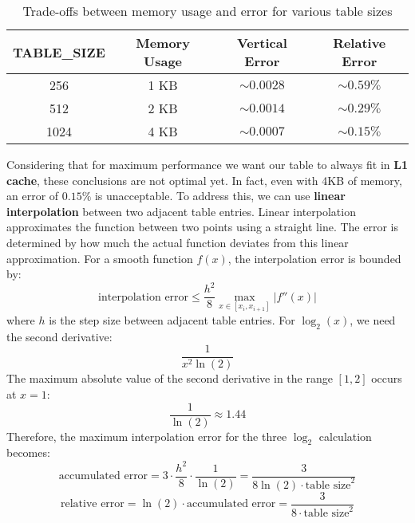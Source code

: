 \documentclass[11pt]{article}
\begin{document}
\begin{table}[h]
\centering
\begin{tabular}{|c|c|c|c|}
\hline
\textbf{TABLE\_SIZE} & \textbf{Memory Usage} & \textbf{Vertical Error} & \textbf{Relative Error} \\
\hline
256  & 1 KB & $\sim 0.0028$ & $\sim 0.59\%$ \\
512  & 2 KB & $\sim 0.0014$ & $\sim 0.29\%$ \\
1024 & 4 KB & $\sim 0.0007$ & $\sim 0.15\%$ \\
\hline
\end{tabular}
\caption{Trade-offs between memory usage and error for various table sizes}
\end{table}
Considering that for maximum performance we want our table to always fit in \textbf{L1 cache}, these conclusions are not optimal yet. In fact, even with 4KB of memory, an error of $0.15\%$ is unacceptable. To address this, we can use \textbf{linear interpolation}\textsuperscript{\cite{linear_interp}} between two adjacent table entries. Linear interpolation approximates the function between two points using a straight line. The error is determined by how much the actual function deviates from this linear approximation. For a smooth function $f(x)$, the interpolation error is bounded by:
\setcounter{equation}{0}
\begin{equation}
    \text{interpolation error} \leq \frac{h^2}{8} \max_{x \in [x_i, x_{i+1}]} |f''(x)|
\end{equation}
where $h$ is the step size between adjacent table entries. For $\log_2(x)$, we need the second derivative:
\begin{equation}
    \frac{1}{x^2 \ln(2)}
\end{equation}
The maximum absolute value of the second derivative in the range $[1, 2]$ occurs at $x = 1$:
\begin{equation}
    \frac{1}{\ln(2)} \approx 1.44
\end{equation}
Therefore, the maximum interpolation error for the three $\log_2$ calculation becomes:
\begin{equation}
    \text{accumulated error} = {3} \cdot {\frac{h^2}{8} \cdot \frac{1}{\ln(2)} = \frac{3}{8\ln(2) \cdot \text{table size}^2}}
\end{equation}
\begin{equation}
    \text{relative error} = \ln(2) \cdot \text{accumulated error} = \frac{3}{8 \cdot \text{table size}^2}
\end{equation}
\end{document}
